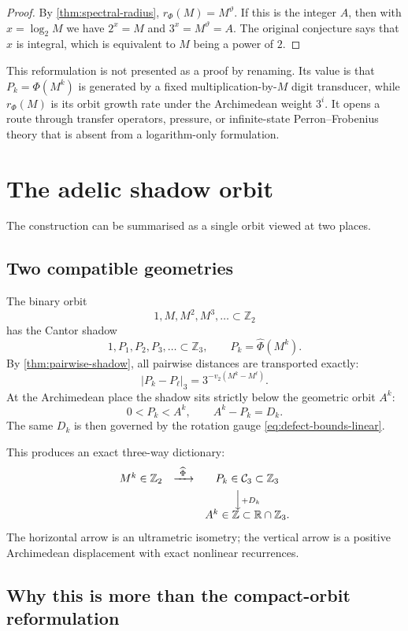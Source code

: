\documentclass[11pt]{article}
\theoremstyle{definition}
\theoremstyle{remark}
\newcommand{\Z}{\mathbb Z}
\newcommand{\R}{\mathbb R}
\newcommand{\vTwo}{v_2}
\newcommand{\PhiMap}{\Phi}
\newcommand{\Cantor}{\mathcal C}
\newcommand{\thetaAE}{\vartheta}
\begin{document}
\begin{proof}
By \cref{thm:spectral-radius}, $r_\Phi(M)=M^{\thetaAE}$.  If this is the
integer $A$, then with $x=\log_2M$ we have $2^x=M$ and
$3^x=M^{\thetaAE}=A$.  The original conjecture says that $x$ is integral,
which is equivalent to $M$ being a power of $2$.
\end{proof}

This reformulation is not presented as a proof by renaming.  Its value is that
$P_k=\PhiMap(M^k)$ is generated by a fixed multiplication-by-$M$ digit
transducer, while $r_\Phi(M)$ is its orbit growth rate under the Archimedean
weight $3^i$.  It opens a route through transfer operators, pressure, or
infinite-state Perron--Frobenius theory that is absent from a logarithm-only
formulation.

\section{The adelic shadow orbit}

The construction can be summarised as a single orbit viewed at two places.

\subsection{Two compatible geometries}

The binary orbit
\[
  1,M,M^2,M^3,\ldots\subset\Z_2
\]
has the Cantor shadow
\[
  1,P_1,P_2,P_3,\ldots\subset\Z_3,
  \qquad P_k=\widehat\Phi(M^k).
\]
By \cref{thm:pairwise-shadow}, all pairwise distances are transported exactly:
\[
  |P_k-P_\ell|_3=3^{-\vTwo(M^k-M^\ell)}.
\]
At the Archimedean place the shadow sits strictly below the geometric orbit
$A^k$:
\[
  0<P_k<A^k,
  \qquad A^k-P_k=D_k.
\]
The same $D_k$ is then governed by the rotation gauge
\eqref{eq:defect-bounds-linear}.

This produces an exact three-way dictionary:
\[
\begin{array}{ccc}
 M^k\in\Z_2
 &\xrightarrow{\ \widehat\Phi\ }
 &P_k\in\Cantor_3\subset\Z_3\\[0.4em]
 &&\Big\downarrow\scriptstyle +D_k\\[-0.1em]
 &&A^k\in\Z\subset\R\cap\Z_3.
\end{array}
\]
The horizontal arrow is an ultrametric isometry; the vertical arrow is a
positive Archimedean displacement with exact nonlinear recurrences.

\subsection{Why this is more than the compact-orbit reformulation}
\end{document}
